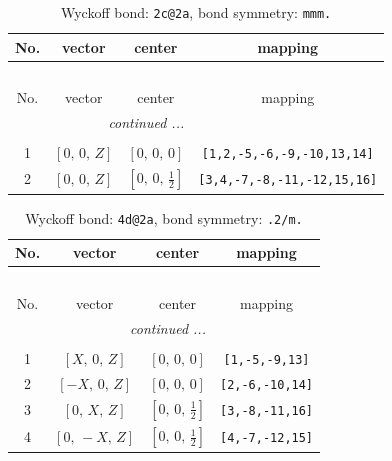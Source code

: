 \documentclass[fleqn,8pt]{jsarticle}
\begin{document}
\renewcommand{\arraystretch}{1.2}
\begin{longtable}{cccc}
\caption{Wyckoff bond: {\tt 2c@2a}, bond symmetry: {\tt mmm.}}
 \\
 \hline \hline
No. & vector & center & mapping \\ \hline \endfirsthead

\multicolumn{3}{l}{\tablename\ \thetable{}} \\
 \hline \hline
No. & vector & center & mapping \\ \hline \endhead

 \hline \hline
\multicolumn{3}{r}{\footnotesize\it continued ...} \\ \endfoot

 \hline \hline
\multicolumn{3}{r}{} \\ \endlastfoot

1 & $\left[ 0,\, 0,\, Z \right]$ & $\left[ 0,\, 0,\, 0 \right]$ & {\tt [1,2,-5,-6,-9,-10,13,14]} \\ \hline
2 & $\left[ 0,\, 0,\, Z \right]$ & $\left[ 0,\, 0,\, \frac{1}{2} \right]$ & {\tt [3,4,-7,-8,-11,-12,15,16]} \\
\end{longtable}
\renewcommand{\arraystretch}{1.2}
\begin{longtable}{cccc}
\caption{Wyckoff bond: {\tt 4d@2a}, bond symmetry: {\tt .2/m.}}
 \\
 \hline \hline
No. & vector & center & mapping \\ \hline \endfirsthead

\multicolumn{3}{l}{\tablename\ \thetable{}} \\
 \hline \hline
No. & vector & center & mapping \\ \hline \endhead

 \hline \hline
\multicolumn{3}{r}{\footnotesize\it continued ...} \\ \endfoot

 \hline \hline
\multicolumn{3}{r}{} \\ \endlastfoot

1 & $\left[ X,\, 0,\, Z \right]$ & $\left[ 0,\, 0,\, 0 \right]$ & {\tt [1,-5,-9,13]} \\ \hline
2 & $\left[ - X,\, 0,\, Z \right]$ & $\left[ 0,\, 0,\, 0 \right]$ & {\tt [2,-6,-10,14]} \\ \hline
3 & $\left[ 0,\, X,\, Z \right]$ & $\left[ 0,\, 0,\, \frac{1}{2} \right]$ & {\tt [3,-8,-11,16]} \\ \hline
4 & $\left[ 0,\, - X,\, Z \right]$ & $\left[ 0,\, 0,\, \frac{1}{2} \right]$ & {\tt [4,-7,-12,15]} \\
\end{longtable}
\end{document}
